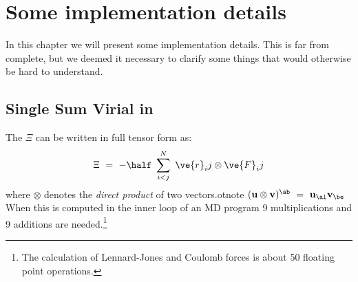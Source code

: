 %
%
%
%
%
%
%

\chapter{Some implementation details}
In this chapter we will present some implementation details. This is
far from complete, but we deemed it necessary to clarify some things
that would otherwise be hard to understand.

\section{Single Sum Virial in {\gromacs}}
\label{sec:virial}
The  $\Xi$ can be written in full tensor form as:
\begin{equation}
\Xi~=~-\half~\sum_{i < j}^N~\ve{r}_ij\otimes\ve{F}_ij
\end{equation}
where $\otimes$ denotes the {\em direct product} of two vectors.otnote
{$({\bf u}\otimes{\bf v})^{\ab}~=~{\bf u}_{\al}{\bf v}_{\be}$} When this is 
computed in the inner loop of an MD program 9 multiplications and 9
additions are needed.\footnote{The calculation of 
Lennard-Jones and Coulomb forces is about 50 floating point operations.}

